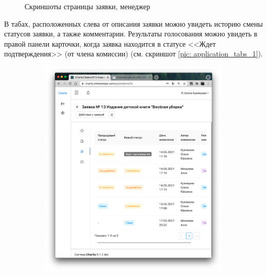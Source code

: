 \documentclass[a4paper,12pt,reqno]{article}
\begin{document}
\begin{figure}[H]
\begin{subfigure}[b]{0.475\linewidth}
		\end{subfigure}
		\caption{Скриншоты страницы заявки, менеджер}
		\label{pic: application_tabs}
	\end{figure}
	
	В табах, расположенных слева от описания заявки можно увидеть историю смены статусов заявки, а также комментарии. Результаты голосования можно увидеть в правой панели карточки, когда заявка находится в статусе <<Ждет подтверждения>> (от члена комиссии) (см. скриншот \ref{pic: application_tabs_1}).
		
	\begin{figure}[H]
	\centering
		\begin{subfigure}[b]{0.475\linewidth}
			\includegraphics[width=\linewidth]{img/ro/application_history.png}
		\end{subfigure}
		\begin{subfigure}[b]{0.475\linewidth}

\end{subfigure}
\end{figure}
\end{document}
